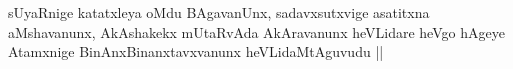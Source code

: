 \begin{artha}
sUyaRnige katatxleya oMdu BAgavanUnx, sadavxsutxvige asatitxna
aMshavanunx, AkAshakekx mUtaRvAda AkAravanunx heVLidare heVgo hAgeye
Atamxnige BinAnxBinanxtavxvanunx heVLidaMtAguvudu ||
\end{artha}




\begin{artha}

\end{artha}

\begin{artha}

\end{artha}

\begin{artha}

\end{artha}

\begin{artha}

\end{artha}

\begin{artha}

\end{artha}

\begin{artha}

\end{artha}

\begin{artha}

\end{artha}

\begin{artha}

\end{artha}

\begin{artha}

\end{artha}

\begin{artha}

\end{artha}

\begin{artha}

\end{artha}

\begin{artha}

\end{artha}


